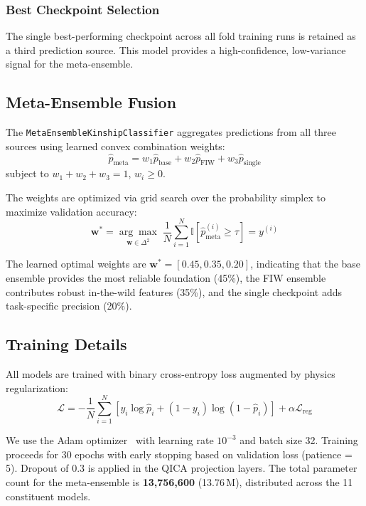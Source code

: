 \documentclass[journal,12pt]{IEEEtran}
\begin{document}
\subsubsection{Best Checkpoint Selection}
The single best-performing checkpoint across all fold training runs is
retained as a third prediction source. This model provides a
high-confidence, low-variance signal for the meta-ensemble.

\subsection{Meta-Ensemble Fusion}
\label{sec:meta_fusion}

The \texttt{MetaEnsembleKinshipClassifier} aggregates predictions from all
three sources using learned convex combination weights:
\begin{equation}
    \hat{p}_{\text{meta}} = w_1 \hat{p}_{\text{base}} + w_2 \hat{p}_{\text{FIW}}
    + w_3 \hat{p}_{\text{single}}
    \label{eq:meta_fusion}
\end{equation}
subject to $w_1 + w_2 + w_3 = 1$, $w_i \geq 0$.

The weights are optimized via grid search over the probability simplex to
maximize validation accuracy:
\begin{equation}
    \mathbf{w}^* = \underset{\mathbf{w} \in \Delta^2}{\arg\max}\;
    \frac{1}{N}\sum_{i=1}^{N} \mathbb{I}\!\left[\hat{p}_{\text{meta}}^{(i)}
    \geq \tau\right] = y^{(i)}
    \label{eq:weight_opt}
\end{equation}

The learned optimal weights are $\mathbf{w}^* = [0.45, 0.35, 0.20]$,
indicating that the base ensemble provides the most reliable foundation
(45\%), the FIW ensemble contributes robust in-the-wild features (35\%),
and the single checkpoint adds task-specific precision (20\%).

\subsection{Training Details}
\label{sec:training_details}

All models are trained with binary cross-entropy loss augmented by
physics regularization:
\begin{equation}
    \mathcal{L} = -\frac{1}{N}\sum_{i=1}^{N}\left[y_i \log \hat{p}_i +
    (1-y_i)\log(1-\hat{p}_i)\right] + \alpha \mathcal{L}_{\text{reg}}
\end{equation}

We use the Adam optimizer~\cite{kingma2014adam} with learning rate $10^{-3}$
and batch size 32. Training proceeds for 30 epochs with early stopping
based on validation loss (patience = 5). Dropout of 0.3 is applied in the
QICA projection layers. The total parameter count for the meta-ensemble
is \textbf{13,756,600} (13.76\,M), distributed across the 11 constituent
models.
\end{document}

